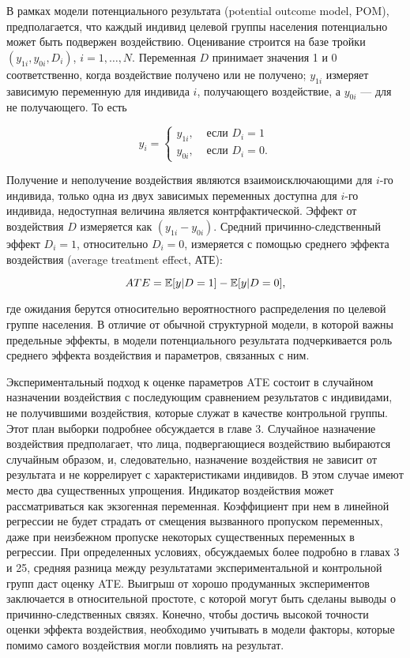 В рамках  модели потенциального результата (potential outcome model, POM),  предполагается, что каждый индивид целевой группы населения потенциально может быть подвержен воздействию. Оценивание строится на базе тройки $(y_{1i},y_{0i},D_{i})$, $i=1,\dots,N$. Переменная $D$ принимает значения 1 и 0 соответственно, когда воздействие получено или не получено; $y_{1i}$ измеряет зависимую переменную для индивида $i$, получающего воздействие, а $y_{0i}$ --- для не получающего. То есть


\begin{equation}
y_{i}=
\begin{cases}
y_{1i}, & \text{ если }D_{i}=1 \\
y_{0i}, &  \text{ если }D_{i}=0.
\end{cases}
\end{equation}

Получение и неполучение воздействия являются взаимоисключающими для $i$-го индивида, только одна из двух зависимых переменных доступна для $i$-го индивида, недоступная величина является контрфактической. Эффект от воздействия $D$ измеряется как $(y_{1i}-y_{0i})$. Средний причинно-следственный эффект $D_{i}=1$, относительно $D_{i}=0$, измеряется с помощью среднего эффекта воздействия (average treatment effect, АТЕ):

\begin{equation}
ATE=\mathbb{E}[y|D=1]-\mathbb{E}[y|D=0],
\end{equation}

где ожидания берутся относительно вероятностного распределения по целевой группе населения. В отличие от обычной структурной модели, в которой важны  предельные эффекты, в модели потенциального результата подчеркивается роль среднего эффекта  воздействия и параметров, связанных с ним.


Экспериментальный подход к оценке параметров ATE состоит в случайном назначении воздействия с последующим сравнением результатов с индивидами, не получившими воздействия, которые служат в качестве контрольной группы. Этот план выборки подробнее обсуждается в главе 3. 
Случайное назначение воздействия  предполагает, что лица, подвергающиеся воздействию выбираются случайным образом, и, следовательно, назначение воздействия не зависит от результата и не коррелирует с характеристиками индивидов. 
В этом случае имеют место два существенных упрощения.
Индикатор воздействия может рассматриваться как экзогенная переменная. Коэффициент при нем в линейной регрессии не будет страдать от смещения вызванного пропуском переменных, даже при неизбежном пропуске  некоторых существенных переменных в регрессии. При определенных условиях, обсуждаемых более подробно в главах 3 и 25, средняя разница между результатами экспериментальной и контрольной групп даст оценку ATE. Выигрыш от хорошо продуманных экспериментов заключается в относительной простоте, с которой могут быть сделаны выводы о причинно-следственных связях. Конечно, чтобы достичь высокой точности оценки эффекта воздействия, необходимо учитывать в модели факторы, которые помимо самого воздействия могли повлиять на результат. 
	
